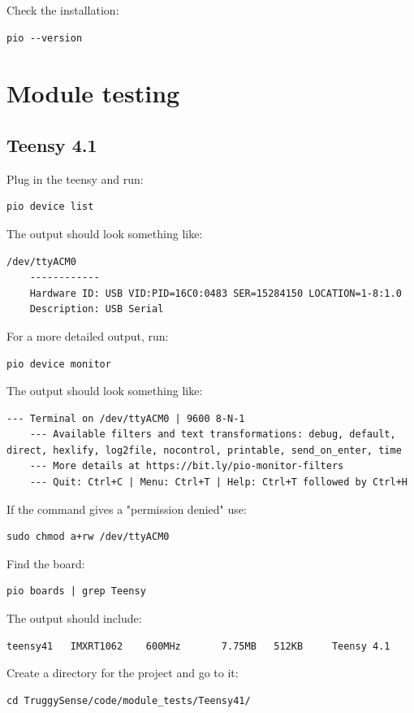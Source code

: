 \documentclass[ti,oneside,10pt]{uantwerpenreport}
\begin{document}
Check the installation:
\begin{lstlisting}[style=cmd]
    pio --version
\end{lstlisting}
\newpage
\section{Module testing}
\subsection{Teensy 4.1}
Plug in the teensy and run:
\begin{lstlisting}[style=cmd]
    pio device list
\end{lstlisting}

The output should look something like:
\begin{lstlisting}[style=script]
    /dev/ttyACM0
    ------------
    Hardware ID: USB VID:PID=16C0:0483 SER=15284150 LOCATION=1-8:1.0
    Description: USB Serial
\end{lstlisting}

For a more detailed output, run:
\begin{lstlisting}[style=cmd]
    pio device monitor
\end{lstlisting}

The output should look something like:
\begin{lstlisting}[style=script]
    --- Terminal on /dev/ttyACM0 | 9600 8-N-1
    --- Available filters and text transformations: debug, default, direct, hexlify, log2file, nocontrol, printable, send_on_enter, time
    --- More details at https://bit.ly/pio-monitor-filters
    --- Quit: Ctrl+C | Menu: Ctrl+T | Help: Ctrl+T followed by Ctrl+H
\end{lstlisting}

If the command gives a "permission denied" use:
\begin{lstlisting}[style=cmd]
    sudo chmod a+rw /dev/ttyACM0
\end{lstlisting}

Find the board:
\begin{lstlisting}[style=cmd]
    pio boards | grep Teensy
\end{lstlisting}

The output should include:
\begin{lstlisting}[style=script]
    teensy41   IMXRT1062    600MHz       7.75MB   512KB     Teensy 4.1
\end{lstlisting}

Create a directory for the project and go to it:
\begin{lstlisting}[style=cmd]
    cd TruggySense/code/module_tests/Teensy41/
\end{lstlisting}
\end{document}
